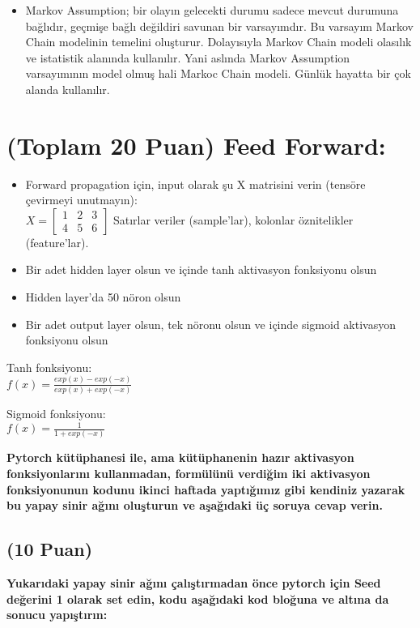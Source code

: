 \documentclass[11pt]{article}
\begin{document}
\begin{itemize}
\begin{itemize}
\begin{itemize}
    \item{Markov Assumption; bir olayın gelecekti durumu sadece mevcut durumuna bağlıdır, geçmişe bağlı değildiri savunan bir varsayımdır. Bu varsayım Markov Chain modelinin temelini oluşturur. Dolayısıyla Markov Chain modeli olasılık ve istatistik alanında kullanılır. Yani aslında Markov Assumption varsayımının model olmuş hali Markoc Chain modeli. Günlük hayatta bir çok alanda kullanılır.}
\end{itemize}

\section{(Toplam 20 Puan) Feed Forward:}
 
\begin{itemize}
    \item Forward propagation için, input olarak şu X matrisini verin (tensöre çevirmeyi unutmayın):\\
    $X = \begin{bmatrix}
        1 & 2 & 3\\
        4 & 5 & 6
        \end{bmatrix}$
    Satırlar veriler (sample'lar), kolonlar öznitelikler (feature'lar).
    \item Bir adet hidden layer olsun ve içinde tanh aktivasyon fonksiyonu olsun
    \item Hidden layer'da 50 nöron olsun
    \item Bir adet output layer olsun, tek nöronu olsun ve içinde sigmoid aktivasyon fonksiyonu olsun
\end{itemize}

Tanh fonksiyonu:\\
$f(x) = \frac{exp(x) - exp(-x)}{exp(x) + exp(-x)}$
\vspace{.2in}

Sigmoid fonksiyonu:\\
$f(x) = \frac{1}{1 + exp(-x)}$

\vspace{.2in}
 \textbf{Pytorch kütüphanesi ile, ama kütüphanenin hazır aktivasyon fonksiyonlarını kullanmadan, formülünü verdiğim iki aktivasyon fonksiyonunun kodunu ikinci haftada yaptığımız gibi kendiniz yazarak bu yapay sinir ağını oluşturun ve aşağıdaki üç soruya cevap verin.}
 
\subsection{(10 Puan)} \textbf{Yukarıdaki yapay sinir ağını çalıştırmadan önce pytorch için Seed değerini 1 olarak set edin, kodu aşağıdaki kod bloğuna ve altına da sonucu yapıştırın:}


\end{itemize}
\end{itemize}
\end{document}
